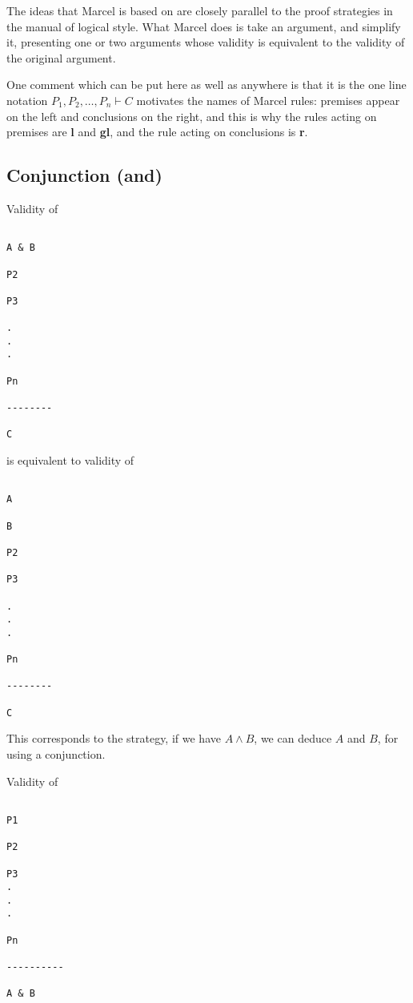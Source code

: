 \documentclass[12pt]{article}
\begin{document}
The ideas that Marcel is based on are closely parallel to the proof strategies in the manual of logical style.  What Marcel does is take an argument, and simplify it, presenting one or two arguments whose validity is equivalent to the validity of the original argument.

One comment which can be put here as well as anywhere is that it is the one line notation
$P_1, P_2, \ldots, P_n \vdash C$ motivates the names of Marcel rules:  premises appear on the left and conclusions on the right, and this is why the rules acting on premises are {\bf l} and {\bf gl}, and the rule acting on conclusions is {\bf r}.

\newpage

\subsection{Conjunction (and)}

Validity of

\begin{verbatim}

A & B

P2

P3

.
.
. 

Pn

--------

C

\end{verbatim}

is equivalent to validity of 

\newpage

\begin{verbatim}

A

B

P2

P3

.
.
. 

Pn

--------

C

\end{verbatim}

This corresponds to the strategy, if we have $A \wedge B$, we can deduce $A$ and $B$, for using a conjunction.

\newpage

Validity of 

\begin{verbatim}

P1

P2 

P3 
.
.
.

Pn

----------

A & B

\end{verbatim}
\end{document}
